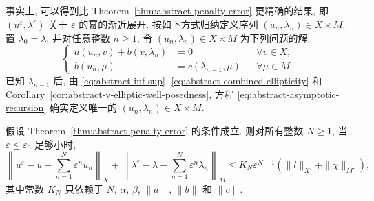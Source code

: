 事实上, 可以得到比 Theorem~\ref{thm:abstract-penalty-error} 更精确的结果,
即 $(u^\varepsilon,\lambda^\varepsilon)$ 关于 $\varepsilon$ 的幂的渐近展开.
按如下方式归纳定义序列 $(u_n,\lambda_n)\in X\times M$.
置 $\lambda_0=\lambda$, 并对任意整数 $n\ge1$, 令
$(u_n,\lambda_n)\in X\times M$ 为下列问题的解:
\begin{equation}\label{eq:abstract-asymptotic-recursion}
\left\{
\begin{aligned}
a(u_n,v)+b(v,\lambda_n)&=0
&&\forall v\in X,\\
b(u_n,\mu)&=c(\lambda_{n-1},\mu)
&&\forall\mu\in M.
\end{aligned}
\right.
\end{equation}
已知 $\lambda_{n-1}$ 后, 由
\eqref{eq:abstract-inf-sup},
\eqref{eq:abstract-combined-ellipticity} 和
Corollary~\ref{cor:abstract-v-elliptic-well-posedness}, 方程
\eqref{eq:abstract-asymptotic-recursion} 确实定义唯一的
$(u_n,\lambda_n)\in X\times M$.

\setcounter{statement}{3}
\begin{Theorem}\label{thm:abstract-penalty-asymptotic-expansion}
假设 Theorem~\ref{thm:abstract-penalty-error} 的条件成立.
则对所有整数 $N\ge1$, 当 $\varepsilon\le\varepsilon_0$ 足够小时,
\begin{equation}\label{eq:abstract-penalty-asymptotic-bound}
\left\|u^\varepsilon-u-\sum_{n=1}^N\varepsilon^nu_n\right\|_X
+\left\|\lambda^\varepsilon-\lambda-
\sum_{n=1}^N\varepsilon^n\lambda_n\right\|_M
\le K_N\varepsilon^{N+1}(\|l\|_{X'}+\|\chi\|_{M'}),
\end{equation}
其中常数 $K_N$ 只依赖于 $N$, $\alpha$, $\beta$, $\|a\|$, $\|b\|$ 和 $\|c\|$.
\end{Theorem}
